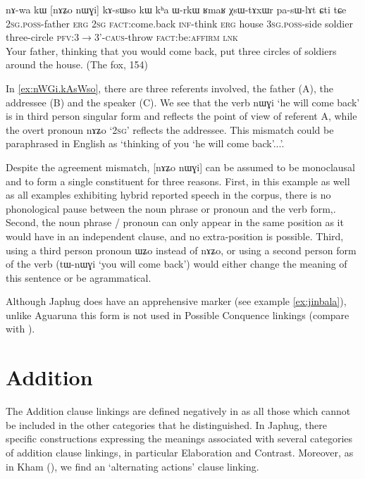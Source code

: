 \documentclass[oldfontcommands,oneside,a4paper,11pt]{article}
\newcommand{\ipa}[1]{{\phon \mbox{#1}}} %
\begin{document}
  \begin{exe}
\ex \label{ex:nWGi.kAsWso}
\gll 
\ipa{nɤ-wa}  	\ipa{kɯ}  	[\ipa{nɤʑo}  	\ipa{nɯɣi}]  	\ipa{kɤ-sɯso}  	\ipa{kɯ}  	\ipa{kʰa}  	\ipa{ɯ-rkɯ}  	\ipa{ʁmaʁ}  	\ipa{χsɯ-tɤxɯr}  	\ipa{pa-sɯ-lɤt}  	\ipa{ɕti}  	\ipa{tɕe}  \\
\textsc{2sg.poss}-father \textsc{erg} \textsc{2sg} \textsc{fact}:come.back  \textsc{inf}-think \textsc{erg} house \textsc{3sg.poss}-side soldier three-circle \textsc{pfv:3$\rightarrow$3'-caus}-throw \textsc{fact}:be:\textsc{affirm} \textsc{lnk}\\
\glt Your father, thinking that you would come back,   put three circles of soldiers around the house. (The fox, 154)

 \end{exe}
 
In \ref{ex:nWGi.kAsWso}, there are three referents involved, the father (A), the addressee (B) and the speaker (C). We see that the verb  	\ipa{nɯɣi} `he will come back' is in third person singular form and reflects the point of view of referent A, while the overt pronoun \ipa{nɤʑo} `\textsc{2sg}' reflects the addressee. This mismatch could be paraphrased in English as `thinking of you `he will come back'...'.  

Despite the agreement mismatch, 	[\ipa{nɤʑo}  	\ipa{nɯɣi}] can be assumed to be monoclausal and to form a single constituent for three reasons. First, in this example as well as all examples exhibiting   hybrid reported speech in the corpus, there is no phonological pause between the noun phrase or pronoun and the verb form,. Second,  the noun phrase / pronoun can only appear in the same position as it would have in an independent clause, and no extra-position is possible. Third, using a third person pronoun \ipa{ɯʑo} instead of \ipa{nɤʑo}, or using a second person form of the verb (\ipa{tɯ-nɯɣi} `you will come back') would either change the meaning of this sentence or be agrammatical.
 
Although Japhug does have an apprehensive marker (see example \ref{ex:jinbala}), unlike Aguaruna this form is not used in Possible Conquence linkings  (compare with \citealt[187]{overall09linking}). 


\section{Addition}
The Addition clause linkings are defined negatively in \citet[26]{dixon09intro} as all those which cannot be included in the other categories that he distinguished. In Japhug,    there   specific constructions   expressing the meanings associated with several categories of addition clause linkings, in particular Elaboration and Contrast. Moreover, as in Kham (\citealt[113]{watters09kham}), we find an `alternating actions' clause linking.
\end{document}
